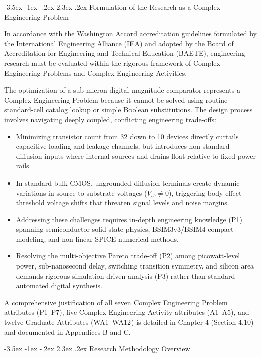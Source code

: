 \documentclass[12pt,a4paper,oneside]{report}
\makeatletter
\renewcommand\section{\@startsection {section}{1}{\z@}%
                                   {-3.5ex \@plus -1ex \@minus -.2ex}%
                                   {2.3ex \@plus.2ex}%
                                   {\normalfont\normalsize\bfseries}}
\makeatother
\begin{document}
\section{Formulation of the Research as a Complex Engineering Problem}

In accordance with the Washington Accord accreditation guidelines formulated by the International Engineering Alliance (IEA) and adopted by the Board of Accreditation for Engineering and Technical Education (BAETE), engineering research must be evaluated within the rigorous framework of Complex Engineering Problems and Complex Engineering Activities. 

The optimization of a sub-micron digital magnitude comparator represents a Complex Engineering Problem because it cannot be solved using routine standard-cell catalog lookup or simple Boolean substitutions. The design process involves navigating deeply coupled, conflicting engineering trade-offs:
\begin{itemize}
\item Minimizing transistor count from 32 down to 10 devices directly curtails capacitive loading and leakage channels, but introduces non-standard diffusion inputs where internal sources and drains float relative to fixed power rails.
\item In standard bulk CMOS, ungrounded diffusion terminals create dynamic variations in source-to-substrate voltages ($V_{sb} \neq 0$), triggering body-effect threshold voltage shifts that threaten signal levels and noise margins.
\item Addressing these challenges requires in-depth engineering knowledge (P1) spanning semiconductor solid-state physics, BSIM3v3/BSIM4 compact modeling, and non-linear SPICE numerical methods.
\item Resolving the multi-objective Pareto trade-off (P2) among picowatt-level power, sub-nanosecond delay, switching transition symmetry, and silicon area demands rigorous simulation-driven analysis (P3) rather than standard automated digital synthesis.
\end{itemize}
A comprehensive justification of all seven Complex Engineering Problem attributes (P1--P7), five Complex Engineering Activity attributes (A1--A5), and twelve Graduate Attributes (WA1--WA12) is detailed in Chapter 4 (Section 4.10) and documented in Appendices B and C.

\section{Research Methodology Overview}
\end{document}

